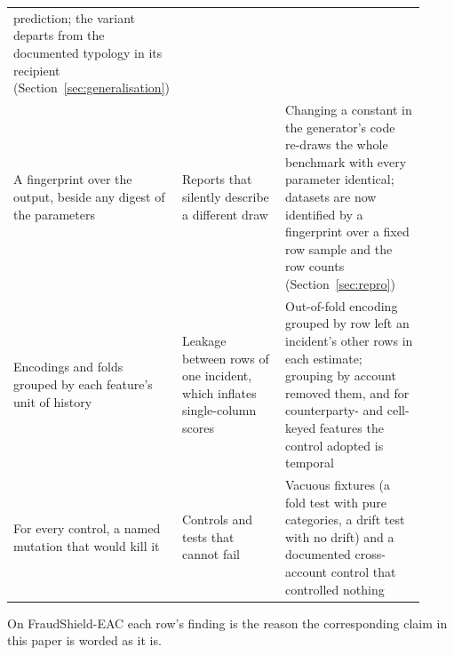 \begin{table}[htbp]
\begin{tabular}{p{0.26\linewidth}p{0.3\linewidth}p{0.36\linewidth}}
prediction; the variant departs from the documented typology in its recipient
(Section~\ref{sec:generalisation}) \\
\addlinespace
A fingerprint over the output, beside any digest of the parameters &
Reports that silently describe a different draw &
Changing a constant in the generator's code re-draws the whole benchmark with every parameter
identical; datasets are now identified by a fingerprint over a fixed row sample and the row counts
(Section~\ref{sec:repro}) \\
\addlinespace
Encodings and folds grouped by each feature's unit of history &
Leakage between rows of one incident, which inflates single-column scores &
Out-of-fold encoding grouped by row left an incident's other rows in each estimate;
grouping by account removed them, and for counterparty- and cell-keyed features the control adopted
is temporal \\
\addlinespace
For every control, a named mutation that would kill it &
Controls and tests that cannot fail &
Vacuous fixtures (a fold test with pure categories, a drift test with no drift) and a documented
cross-account control that controlled nothing \\
\bottomrule
\end{tabular}
\end{table}

On FraudShield-EAC each row's finding is the reason the corresponding claim in this paper is worded
as it is.
